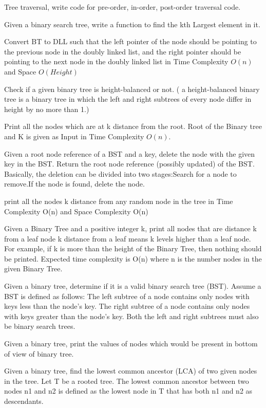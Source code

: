 {\begin{exercise}
\newpage
{}
\begin{compactenum}
    \item Tree traversal, write code for pre-order, in-order, post-order traversal code.
    \item Given a binary search tree, write a function to find the kth Largest element in it.
    \item Convert BT to DLL such that the left pointer of the node should be pointing to the previous node in the doubly linked list, and the right pointer should be pointing to the next node in the doubly linked list in Time Complexity $O(n)$ and Space $O(Height)$
    \item Check if a given binary tree is height-balanced or not. ( a height-balanced binary tree is a binary tree in which the left and right subtrees of every node differ in height by no more than 1.)
    \item Print all the nodes which are at k distance from the root. Root of the Binary tree and K is given as Input in Time Complexity $O(n)$.
    \item Given a root node reference of a BST and a key, delete the node with the given key in the BST. Return the root node reference (possibly updated) of the BST.
    Basically, the deletion can be divided into two stages:Search for a node to remove.If the node is found, delete the node.
    \item print all the nodes k distance from any random node in the tree in Time Complexity O(n) and Space Complexity O(n) 
    \item Given a Binary Tree and a positive integer k, print all nodes that are distance k from a leaf node k distance from a leaf means k levels higher than a leaf node. For example, if k is more than the height of the Binary Tree, then nothing should be printed. Expected time complexity is O(n) where n is the number nodes in the given Binary Tree.
    \item Given a binary tree, determine if it is a valid binary search tree (BST).
    Assume a BST is defined as follows:
    The left subtree of a node contains only nodes with keys less than the node's key.
    The right subtree of a node contains only nodes with keys greater than the node's key.
    Both the left and right subtrees must also be binary search trees.
    \item Given a binary tree, print the values of nodes which would be present in bottom of view of binary tree.
    \item  Given a binary tree, find the lowest common ancestor (LCA) of two given nodes in the tree. Let T be a rooted tree. The lowest common ancestor between two nodes n1 and n2 is defined as the lowest node in T that has both n1 and n2 as descendants.

\end{compactenum}
\end{exercise}}
